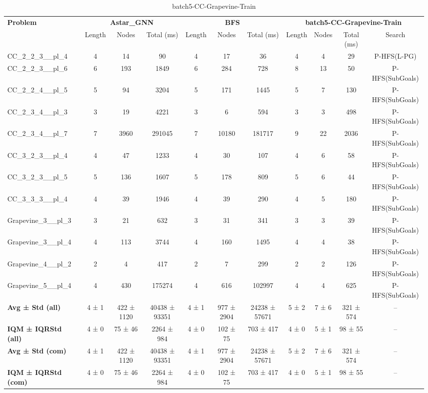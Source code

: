 \begin{table}[!ht]
\centering
\scriptsize
\begin{tabular}{l|ccc|ccc|cccc}
\multirow{2}{*}{\textbf{Problem}} & \multicolumn{3}{c|}{\textbf{Astar\_GNN}} & \multicolumn{3}{c|}{\textbf{BFS}} & \multicolumn{4}{c}{\textbf{batch5-CC-Grapevine-Train}} \\
\cline{2-11}
& Length & Nodes & Total (ms) & Length & Nodes & Total (ms) & Length & Nodes & Total (ms) & Search \\
\hline
CC\_2\_2\_3\_\_pl\_4 & 4 & 14 & 90 & 4 & 17 & 36 & 4 & 4 & 29 & P-HFS(L-PG) \\
CC\_2\_2\_3\_\_pl\_6 & 6 & 193 & 1849 & 6 & 284 & 728 & 8 & 13 & 50 & P-HFS(SubGoals) \\
CC\_2\_2\_4\_\_pl\_5 & 5 & 94 & 3204 & 5 & 171 & 1445 & 5 & 7 & 130 & P-HFS(SubGoals) \\
CC\_2\_3\_4\_\_pl\_3 & 3 & 19 & 4221 & 3 & 6 & 594 & 3 & 3 & 498 & P-HFS(SubGoals) \\
CC\_2\_3\_4\_\_pl\_7 & 7 & 3960 & 291045 & 7 & 10180 & 181717 & 9 & 22 & 2036 & P-HFS(SubGoals) \\
CC\_3\_2\_3\_\_pl\_4 & 4 & 47 & 1233 & 4 & 30 & 107 & 4 & 6 & 58 & P-HFS(SubGoals) \\
CC\_3\_2\_3\_\_pl\_5 & 5 & 136 & 1607 & 5 & 178 & 809 & 5 & 6 & 44 & P-HFS(SubGoals) \\
CC\_3\_3\_3\_\_pl\_4 & 4 & 39 & 1946 & 4 & 39 & 290 & 4 & 5 & 180 & P-HFS(SubGoals) \\
Grapevine\_3\_\_pl\_3 & 3 & 21 & 632 & 3 & 31 & 341 & 3 & 3 & 39 & P-HFS(SubGoals) \\
Grapevine\_3\_\_pl\_4 & 4 & 113 & 3744 & 4 & 160 & 1495 & 4 & 4 & 38 & P-HFS(SubGoals) \\
Grapevine\_4\_\_pl\_2 & 2 & 4 & 417 & 2 & 7 & 299 & 2 & 2 & 126 & P-HFS(SubGoals) \\
Grapevine\_5\_\_pl\_4 & 4 & 430 & 175274 & 4 & 616 & 102997 & 4 & 4 & 625 & P-HFS(SubGoals) \\
\hline
\textbf{Avg ± Std (all)} & 4 ± 1 & 422 ± 1120 & 40438 ± 93351 & 4 ± 1 & 977 ± 2904 & 24238 ± 57671 & 5 ± 2 & 7 ± 6 & 321 ± 574 & -- \\
\textbf{IQM ± IQRStd (all)} & 4 ± 0 & 75 ± 46 & 2264 ± 984 & 4 ± 0 & 102 ± 75 & 703 ± 417 & 4 ± 0 & 5 ± 1 & 98 ± 55 & -- \\
\textbf{Avg ± Std (com)} & 4 ± 1 & 422 ± 1120 & 40438 ± 93351 & 4 ± 1 & 977 ± 2904 & 24238 ± 57671 & 5 ± 2 & 7 ± 6 & 321 ± 574 & -- \\
\textbf{IQM ± IQRStd (com)} & 4 ± 0 & 75 ± 46 & 2264 ± 984 & 4 ± 0 & 102 ± 75 & 703 ± 417 & 4 ± 0 & 5 ± 1 & 98 ± 55 & -- \\
\end{tabular}
\caption{batch5-CC-Grapevine-Train}
\label{tab:batch5_CC-Grapevine_comparison_train}
\end{table}

